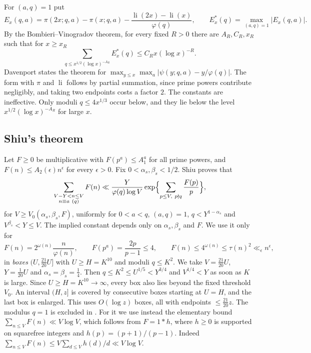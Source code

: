 \documentclass[10pt,reqno]{amsart}
\theoremstyle{remark}
\newcommand{\li}{\operatorname{li}}
\begin{document}
For $(a,q)=1$ put
\[
 E_x(q,a)=\pi(2x;q,a)-\pi(x;q,a)-\frac{\li(2x)-\li(x)}{\varphi(q)},
 \qquad E^*_x(q)=\max_{(a,q)=1}|E_x(q,a)|.
\]
By the Bombieri--Vinogradov theorem, for every fixed $R>0$ there are
$A_R,C_R,x_R$ such that for $x\geq x_R$
\begin{equation}\label{eq:BV}
 \sum_{q\leq x^{1/2}(\log x)^{-A_R}}E^*_x(q)\leq C_Rx(\log x)^{-R}.
\end{equation}
Davenport \cite[Ch.~28]{Davenport} states the theorem for
$\max_{y\leq x}\max_a|\psi(y;q,a)-y/\varphi(q)|$.  The form with $\pi$
and $\li$ follows by partial summation, since prime powers contribute
negligibly, and taking two endpoints costs a factor $2$.  The constants
are ineffective.  Only moduli $q\leq4x^{1/3}$ occur below, and they lie
below the level $x^{1/2}(\log x)^{-A_R}$ for large $x$.

\subsection*{Shiu's theorem}
Let $F\geq0$ be multiplicative with $F(p^a)\leq A_1^a$ for all prime
powers, and $F(n)\leq A_2(\epsilon)n^\epsilon$ for every $\epsilon>0$.
Fix $0<\alpha_s,\beta_s<1/2$.  Shiu \cite[Thm.~1]{Shiu} proves that
\begin{equation}\label{eq:Shiu}
 \sum_{\substack{V-Y<n\leq V\\n\equiv a\ (q)}}F(n)
 \ll\frac{Y}{\varphi(q)\log V}
 \exp\Bigl\{\sum_{p\leq V,\ p\nmid q}\frac{F(p)}p\Bigr\},
\end{equation}
for $V\geq V_0(\alpha_s,\beta_s,F)$, uniformly for $0<a<q$, $(a,q)=1$,
$q<Y^{1-\alpha_s}$ and $V^{\beta_s}<Y\leq V$.  The implied constant depends
only on $\alpha_s,\beta_s$ and $F$.  We use it only for
\[
 F(n)=2^{\omega(n)}\frac n{\varphi(n)},\qquad F(p^a)=\frac{2p}{p-1}\leq4,
 \qquad F(n)\leq4^{\omega(n)}\leq\tau(n)^2\ll_\epsilon n^\epsilon,
\]
in \emph{boxes} $(U,\frac{21}{20}U]$ with $U\geq H=K^{10}$ and moduli
$q\leq K^2$.  We take $V=\frac{21}{20}U$, $Y=\frac1{20}U$ and
$\alpha_s=\beta_s=\frac14$.  Then $q\leq K^2\leq U^{1/5}<Y^{3/4}$ and
$V^{1/4}<Y$ as soon as $K$ is large.  Since $U\geq H=K^{10}\to\infty$,
every box also lies beyond the fixed threshold $V_0$.  An interval
$(H,z]$ is covered by consecutive boxes starting at $U=H$, and the last
box is enlarged.  This
uses $O(\log z)$ boxes, all with endpoints $\leq\frac{21}{20}z$.  The
modulus $q=1$ is excluded in \cite{Shiu}.  For it we use instead the
elementary bound $\sum_{n\leq V}F(n)\ll V\log V$, which follows from
$F=1*h$, where $h\geq0$ is supported on squarefree integers and
$h(p)=(p+1)/(p-1)$.  Indeed
$\sum_{n\leq V}F(n)\leq V\sum_{d\leq V}h(d)/d\ll V\log V$.
\end{document}
